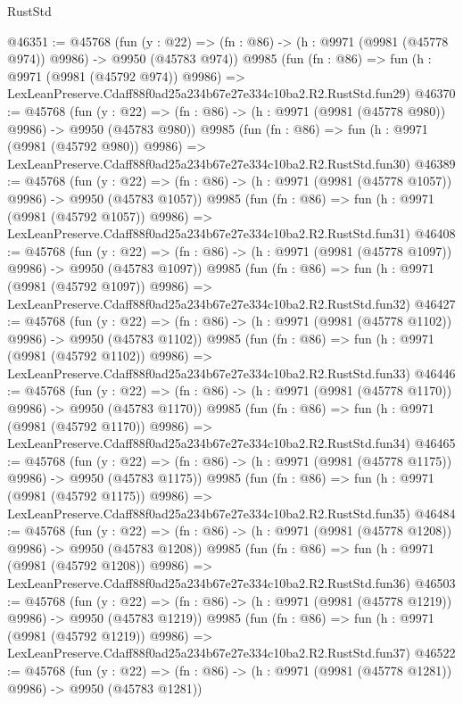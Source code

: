\begin{lexlean}{RustStd}
\begin{coremodule}
@46351 := @45768
    (fun (y : @22) => (fn : @86) -> (h : @9971 (@9981 (@45778 @974)) @9986) -> @9950 (@45783 @974))
    @9985
    (fun (fn : @86) =>
    fun (h : @9971 (@9981 (@45792 @974)) @9986) =>
    LexLeanPreserve.Cdaff88f0ad25a234b67e27e334c10ba2.R2.RustStd.fun29)
@46370 := @45768
    (fun (y : @22) => (fn : @86) -> (h : @9971 (@9981 (@45778 @980)) @9986) -> @9950 (@45783 @980))
    @9985
    (fun (fn : @86) =>
    fun (h : @9971 (@9981 (@45792 @980)) @9986) =>
    LexLeanPreserve.Cdaff88f0ad25a234b67e27e334c10ba2.R2.RustStd.fun30)
@46389 := @45768
    (fun (y : @22) =>
    (fn : @86) -> (h : @9971 (@9981 (@45778 @1057)) @9986) -> @9950 (@45783 @1057))
    @9985
    (fun (fn : @86) =>
    fun (h : @9971 (@9981 (@45792 @1057)) @9986) =>
    LexLeanPreserve.Cdaff88f0ad25a234b67e27e334c10ba2.R2.RustStd.fun31)
@46408 := @45768
    (fun (y : @22) =>
    (fn : @86) -> (h : @9971 (@9981 (@45778 @1097)) @9986) -> @9950 (@45783 @1097))
    @9985
    (fun (fn : @86) =>
    fun (h : @9971 (@9981 (@45792 @1097)) @9986) =>
    LexLeanPreserve.Cdaff88f0ad25a234b67e27e334c10ba2.R2.RustStd.fun32)
@46427 := @45768
    (fun (y : @22) =>
    (fn : @86) -> (h : @9971 (@9981 (@45778 @1102)) @9986) -> @9950 (@45783 @1102))
    @9985
    (fun (fn : @86) =>
    fun (h : @9971 (@9981 (@45792 @1102)) @9986) =>
    LexLeanPreserve.Cdaff88f0ad25a234b67e27e334c10ba2.R2.RustStd.fun33)
@46446 := @45768
    (fun (y : @22) =>
    (fn : @86) -> (h : @9971 (@9981 (@45778 @1170)) @9986) -> @9950 (@45783 @1170))
    @9985
    (fun (fn : @86) =>
    fun (h : @9971 (@9981 (@45792 @1170)) @9986) =>
    LexLeanPreserve.Cdaff88f0ad25a234b67e27e334c10ba2.R2.RustStd.fun34)
@46465 := @45768
    (fun (y : @22) =>
    (fn : @86) -> (h : @9971 (@9981 (@45778 @1175)) @9986) -> @9950 (@45783 @1175))
    @9985
    (fun (fn : @86) =>
    fun (h : @9971 (@9981 (@45792 @1175)) @9986) =>
    LexLeanPreserve.Cdaff88f0ad25a234b67e27e334c10ba2.R2.RustStd.fun35)
@46484 := @45768
    (fun (y : @22) =>
    (fn : @86) -> (h : @9971 (@9981 (@45778 @1208)) @9986) -> @9950 (@45783 @1208))
    @9985
    (fun (fn : @86) =>
    fun (h : @9971 (@9981 (@45792 @1208)) @9986) =>
    LexLeanPreserve.Cdaff88f0ad25a234b67e27e334c10ba2.R2.RustStd.fun36)
@46503 := @45768
    (fun (y : @22) =>
    (fn : @86) -> (h : @9971 (@9981 (@45778 @1219)) @9986) -> @9950 (@45783 @1219))
    @9985
    (fun (fn : @86) =>
    fun (h : @9971 (@9981 (@45792 @1219)) @9986) =>
    LexLeanPreserve.Cdaff88f0ad25a234b67e27e334c10ba2.R2.RustStd.fun37)
@46522 := @45768
    (fun (y : @22) =>
    (fn : @86) -> (h : @9971 (@9981 (@45778 @1281)) @9986) -> @9950 (@45783 @1281))

\end{coremodule}
\end{lexlean}
